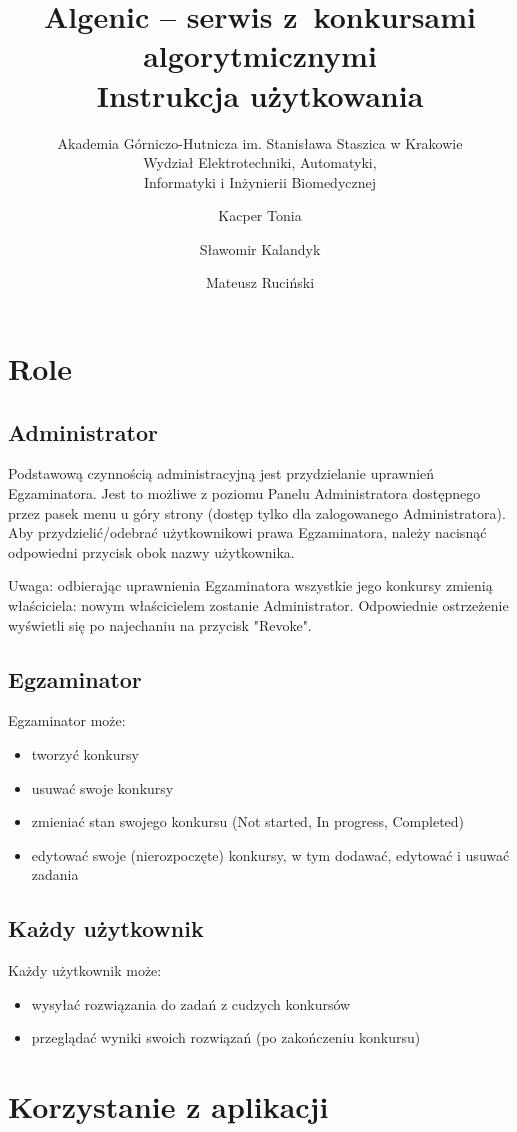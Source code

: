 \documentclass{article}
\title{Algenic -- serwis z~konkursami algorytmicznymi\\
Instrukcja użytkowania}
\subtitle{Akademia Górniczo-Hutnicza im. Stanisława Staszica w Krakowie\\
	Wydział Elektrotechniki, Automatyki,\\
	Informatyki i Inżynierii Biomedycznej}
\author{Kacper Tonia\and
		Sławomir Kalandyk\and
		Mateusz Ruciński}
\date{}
\begin{document}
\maketitle

\section{Role}
\subsection{Administrator}
Podstawową czynnością administracyjną jest przydzielanie uprawnień Egzaminatora. Jest to możliwe z poziomu Panelu Administratora dostępnego przez pasek menu u góry strony (dostęp tylko dla zalogowanego Administratora). Aby przydzielić/odebrać użytkownikowi prawa Egzaminatora, należy nacisnąć odpowiedni przycisk obok nazwy użytkownika.

Uwaga: odbierając uprawnienia Egzaminatora wszystkie jego konkursy zmienią właściciela: nowym właścicielem zostanie Administrator. Odpowiednie ostrzeżenie wyświetli się po najechaniu na przycisk "Revoke".

\subsection{Egzaminator}
Egzaminator może:
\begin{itemize}
    \item tworzyć konkursy
    \item usuwać swoje konkursy
    \item zmieniać stan swojego konkursu (Not started, In progress, Completed)
    \item edytować swoje (nierozpoczęte) konkursy, w tym dodawać, edytować i usuwać zadania
\end{itemize}

\subsection{Każdy użytkownik}
Każdy użytkownik może:
\begin{itemize}
    \item wysyłać rozwiązania do zadań z cudzych konkursów
    \item przeglądać wyniki swoich rozwiązań (po zakończeniu konkursu)
\end{itemize}

\section{Korzystanie z aplikacji}
\end{document}
